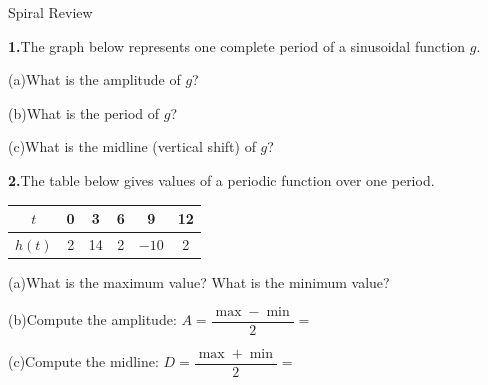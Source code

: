 \documentclass[10pt]{article}
\begin{document}
\namedateperiod

\vspace{0.12in}

\begin{notesbox}{Spiral Review}

\textbf{1.}\quad The graph below represents one complete period of a sinusoidal
function $g$.

\vspace{6pt}
\begin{center}
\end{center}

\vspace{6pt}
(a)\quad What is the amplitude of $g$? \writeline

\vspace{4pt}
(b)\quad What is the period of $g$? \writeline

\vspace{4pt}
(c)\quad What is the midline (vertical shift) of $g$? \writeline

\vspace{0.14in}
\textbf{2.}\quad The table below gives values of a periodic function over one period.

\vspace{4pt}
\begin{center}
\renewcommand{\arraystretch}{1.4}
\begin{tabular}{|c|c|c|c|c|c|}
\hline
$t$ & 0 & 3 & 6 & 9 & 12 \\
\hline
$h(t)$ & 2 & 14 & 2 & $-10$ & 2 \\
\hline
\end{tabular}
\end{center}

\vspace{6pt}
(a)\quad What is the maximum value? \underline{\hspace{1.8cm}}
\quad What is the minimum value? \underline{\hspace{1.8cm}}

\vspace{4pt}
(b)\quad Compute the amplitude: $A = \dfrac{\max - \min}{2} = $ \writeline

\vspace{4pt}
(c)\quad Compute the midline: $D = \dfrac{\max + \min}{2} = $ \writeline

\end{notesbox}
\end{document}
